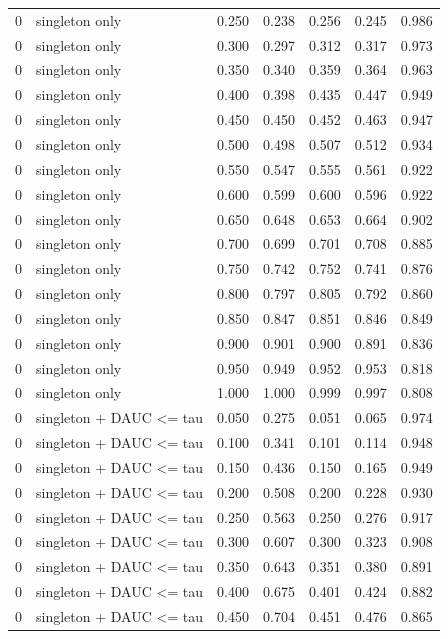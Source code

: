 \begin{tabular}{rlrrrrr}
0 & singleton only & 0.250 & 0.238 & 0.256 & 0.245 & 0.986 \\
0 & singleton only & 0.300 & 0.297 & 0.312 & 0.317 & 0.973 \\
0 & singleton only & 0.350 & 0.340 & 0.359 & 0.364 & 0.963 \\
0 & singleton only & 0.400 & 0.398 & 0.435 & 0.447 & 0.949 \\
0 & singleton only & 0.450 & 0.450 & 0.452 & 0.463 & 0.947 \\
0 & singleton only & 0.500 & 0.498 & 0.507 & 0.512 & 0.934 \\
0 & singleton only & 0.550 & 0.547 & 0.555 & 0.561 & 0.922 \\
0 & singleton only & 0.600 & 0.599 & 0.600 & 0.596 & 0.922 \\
0 & singleton only & 0.650 & 0.648 & 0.653 & 0.664 & 0.902 \\
0 & singleton only & 0.700 & 0.699 & 0.701 & 0.708 & 0.885 \\
0 & singleton only & 0.750 & 0.742 & 0.752 & 0.741 & 0.876 \\
0 & singleton only & 0.800 & 0.797 & 0.805 & 0.792 & 0.860 \\
0 & singleton only & 0.850 & 0.847 & 0.851 & 0.846 & 0.849 \\
0 & singleton only & 0.900 & 0.901 & 0.900 & 0.891 & 0.836 \\
0 & singleton only & 0.950 & 0.949 & 0.952 & 0.953 & 0.818 \\
0 & singleton only & 1.000 & 1.000 & 0.999 & 0.997 & 0.808 \\
0 & singleton + DAUC <= tau & 0.050 & 0.275 & 0.051 & 0.065 & 0.974 \\
0 & singleton + DAUC <= tau & 0.100 & 0.341 & 0.101 & 0.114 & 0.948 \\
0 & singleton + DAUC <= tau & 0.150 & 0.436 & 0.150 & 0.165 & 0.949 \\
0 & singleton + DAUC <= tau & 0.200 & 0.508 & 0.200 & 0.228 & 0.930 \\
0 & singleton + DAUC <= tau & 0.250 & 0.563 & 0.250 & 0.276 & 0.917 \\
0 & singleton + DAUC <= tau & 0.300 & 0.607 & 0.300 & 0.323 & 0.908 \\
0 & singleton + DAUC <= tau & 0.350 & 0.643 & 0.351 & 0.380 & 0.891 \\
0 & singleton + DAUC <= tau & 0.400 & 0.675 & 0.401 & 0.424 & 0.882 \\
0 & singleton + DAUC <= tau & 0.450 & 0.704 & 0.451 & 0.476 & 0.865 \\

\end{tabular}
